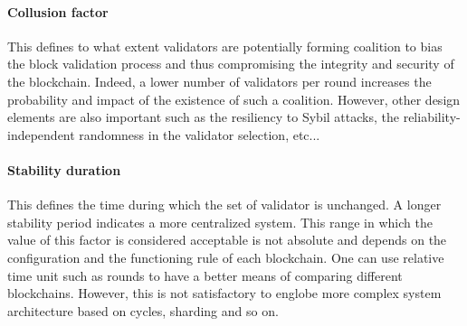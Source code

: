 \documentclass{article}
\begin{document}
\paragraph{Collusion factor} This defines to what extent validators are potentially forming coalition to bias the block validation process and thus compromising the integrity and security of the blockchain. Indeed, a lower number of validators per round increases the probability and impact of the existence of such a coalition. However, other design elements are also important such as the resiliency to Sybil attacks, the reliability-independent randomness in the validator selection, etc...    


\paragraph{Stability duration} This defines the time during which the set of validator is unchanged. A longer stability period indicates a more centralized system. This range in which the value of this factor is considered acceptable is not absolute and depends on the configuration and the functioning rule of each blockchain. One can use relative time unit such as rounds to have a better means of comparing different blockchains. However, this is not satisfactory to englobe more complex system architecture based on cycles, sharding and so on. 
\end{document}
